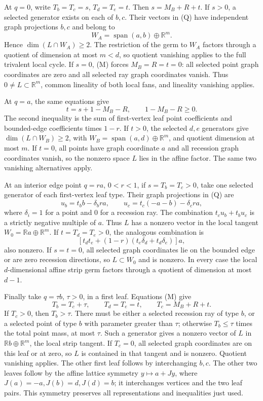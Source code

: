 \documentclass[
  11pt,
]{article}
\begin{document}
At \(q=0\), write \(T_b=T_c=s\), \(T_d=T_e=t\). Then \(s=M_B+R+t\). If
\(s>0\), a selected generator exists on each of \(b,c\). Their vectors
in (Q) have independent graph projections \(b,c\) and belong to \[
W_A=\operatorname{span}(a,b)\oplus\mathbb R^m.
\] Hence \(\dim(L\cap W_A)\geq2\). The restriction of the germ to
\(W_A\) factors through a quotient of dimension at most \(m<d\), so
quotient vanishing applies to the full trivalent local cycle. If
\(s=0\), (M) forces \(M_B=R=t=0\): all selected point graph coordinates
are zero and all selected ray graph coordinates vanish. Thus
\(0\ne L\subset\mathbb R^m\), common lineality of both local fans, and
lineality vanishing applies.

At \(q=a\), the same equations give \[
t=s+1-M_B-R,
\qquad 1-M_B-R\geq0.
\] The second inequality is the sum of first-vertex leaf point
coefficients and bounded-edge coefficients times \(1-r\). If \(t>0\),
the selected \(d,e\) generators give \(\dim(L\cap W_B)\geq2\), with
\(W_B=\operatorname{span}(a,d)\oplus\mathbb R^m\), and quotient
dimension at most \(m\). If \(t=0\), all points have graph coordinate
\(a\) and all recession graph coordinates vanish, so the nonzero space
\(L\) lies in the affine factor. The same two vanishing alternatives
apply.

At an interior edge point \(q=ra\), \(0<r<1\), if \(s=T_b=T_c>0\), take
one selected generator of each first-vertex leaf type. Their graph
projections in (Q) are \[
u_b=t_b b-\delta_b ra,\qquad
u_c=t_c(-a-b)-\delta_c ra,
\] where \(\delta_i=1\) for a point and \(0\) for a recession ray. The
combination \(t_cu_b+t_bu_c\) is a strictly negative multiple of \(a\).
Thus \(L\) has a nonzero vector in the local tangent
\(W_0=\mathbb Ra\oplus\mathbb R^m\). If \(t=T_d=T_e>0\), the analogous
combination is \[
[t_dt_e+(1-r)(t_e\delta_d+t_d\delta_e)]a,
\] also nonzero. If \(s=t=0\), all selected graph coordinates lie on the
bounded edge or are zero recession directions, so \(L\subset W_0\) and
is nonzero. In every case the local \(d\)-dimensional affine strip germ
factors through a quotient of dimension at most \(d-1\).

Finally take \(q=\tau b\), \(\tau>0\), in a first leaf. Equations (M)
give \[
T_b=T_c+\tau,\qquad T_d=T_e=t,
\qquad T_c=M_B+R+t.
\] If \(T_c>0\), then \(T_b>\tau\). There must be either a selected
recession ray of type \(b\), or a selected point of type \(b\) with
parameter greater than \(\tau\); otherwise \(T_b\leq\tau\) times the
total point mass, at most \(\tau\). Such a generator gives a nonzero
vector of \(L\) in \(\mathbb Rb\oplus\mathbb R^m\), the local strip
tangent. If \(T_c=0\), all selected graph coordinates are on this leaf
or at zero, so \(L\) is contained in that tangent and is nonzero.
Quotient vanishing applies. The other first leaf follows by
interchanging \(b,c\). The other two leaves follow by the affine lattice
symmetry \(y\mapsto a+Jy\), where \(J(a)=-a,J(b)=d,J(d)=b\); it
interchanges vertices and the two leaf pairs. This symmetry preserves
all representations and inequalities just used.
\end{document}
